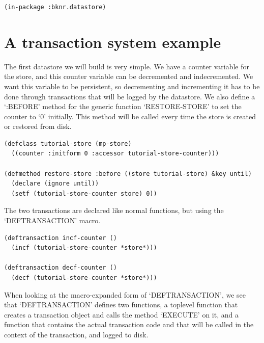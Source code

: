 \begin{Verbatim}[fontsize=\small,frame=leftline,framerule=0.9mm,rulecolor=\color{gray},framesep=5.1mm,xleftmargin=5mm,fontfamily=cmtt]
(in-package :bknr.datastore)
\end{Verbatim}


\section{ A transaction system example}
The first datastore we will build is very simple. We have a
counter variable for the store, and this counter variable can be
decremented and indecremented. We want this variable to be
persistent, so decrementing and incrementing it has to be done
through transactions that will be logged by the datastore. We also
define a `:BEFORE' method for the generic function `RESTORE-STORE'
to set the counter to `0' initially. This method will be called
every time the store is created or restored from disk.

\begin{Verbatim}[fontsize=\small,frame=leftline,framerule=0.9mm,rulecolor=\color{gray},framesep=5.1mm,xleftmargin=5mm,fontfamily=cmtt]
(defclass tutorial-store (mp-store)
  ((counter :initform 0 :accessor tutorial-store-counter)))

(defmethod restore-store :before ((store tutorial-store) &key until)
  (declare (ignore until))
  (setf (tutorial-store-counter store) 0))
\end{Verbatim}
The two transactions are declared like normal functions, but using
the `DEFTRANSACTION' macro. 

\begin{Verbatim}[fontsize=\small,frame=leftline,framerule=0.9mm,rulecolor=\color{gray},framesep=5.1mm,xleftmargin=5mm,fontfamily=cmtt]
(deftransaction incf-counter ()
  (incf (tutorial-store-counter *store*)))

(deftransaction decf-counter ()
  (decf (tutorial-store-counter *store*)))
\end{Verbatim}
When looking at the macro-expanded form of `DEFTRANSACTION', we
see that `DEFTRANSACTION' defines two functions, a toplevel
function that creates a transaction object and calls the method
`EXECUTE' on it, and a function that contains the actual
transaction code and that will be called in the context of the
transaction, and logged to disk.


